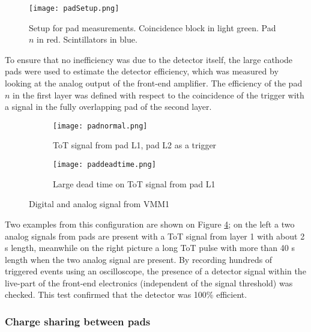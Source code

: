 \begin{figure}[ht]
\centering
\texttt{[image: padSetup.png]}
\caption{Setup for pad measurements. Coincidence block in  light green. Pad $n$ in red. Scintillators in blue.}\label{padsetup}
\end{figure}


To ensure that no inefficiency was due to the detector itself, the large cathode pads were used to estimate the detector
efficiency, which was measured by looking at the analog output of the front-end amplifier. The efficiency of the pad $n$
in the first layer was defined with respect to the coincidence of the trigger with a signal in the fully overlapping pad
of the second layer. \par



\begin{figure}[t]
\centering
\hspace*{\fill}
\begin{subfigure}[b]{0.45\textwidth}
\centering
\texttt{[image: padnormal.png]}
\caption{ToT signal from pad L1, pad L2 as a trigger}\label{scope1}
\end{subfigure}
\hfill
\begin{subfigure}[b]{0.45\textwidth}
\centering
\texttt{[image: paddeadtime.png]}
\caption{Large dead time on ToT signal from pad L1}\label{scope2}
\end{subfigure}
\hspace*{\fill}
\caption{Digital and analog signal from VMM1}\label{scope}
\end{figure}

Two examples from this configuration are shown on Figure \ref{scope}; on the left a two analog signals from pads are
present with a ToT signal from layer 1 with about 2 \micro s length, meanwhile on the right picture a long ToT pulse
with more than 40 \micro s length when the two analog signal are present. By recording hundreds of triggered events
using an oscilloscope, the presence of a detector signal within the live-part of the front-end electronics (independent
of the signal threshold) was checked. This test confirmed that the detector was 100\% efficient.\par


\subsubsection{Charge sharing between pads}


